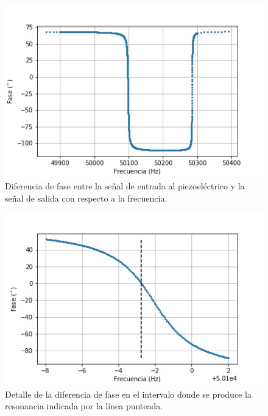 \documentclass[twoside,twocolumn,a4paper]{article}
\begin{document}
\begin{figure}[H]
\includegraphics[width=\linewidth]{AMPvsFASE.jpg}
\caption{Diferencia de fase entre la se\~nal de entrada al piezoel\'ectrico y la se\~nal de salida con respecto a la frecuencia.}
\label{fig:fase}
\end{figure}

\begin{figure}[H]
\includegraphics[width=\linewidth]{bajada.jpg}
\caption{Detalle de la diferencia de fase en el intervalo donde se produce la resonancia indicada por la l\'inea punteada.}
\label{fig:bajada}
\end{figure}
\end{document}
